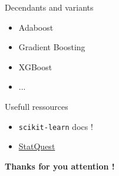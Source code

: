 \documentclass{irdbeamer}
\begin{document}
\begin{frame}{Decendants and variants}
    \begin{itemize}
        \item Adaboost
        \item Gradient Boosting
        \item XGBoost
        \item ...
    \end{itemize}
\end{frame}

\begin{frame}{Usefull ressources}
\begin{itemize}
    \item \texttt{scikit-learn} docs !
    \item \href{https://www.youtube.com/@statquest}{StatQuest}
\end{itemize}
\end{frame}

\begin{frame}[plain]
    \Huge{\textbf{Thanks for you attention !}}
    
    \vfill
    
\end{frame}

\end{document}
